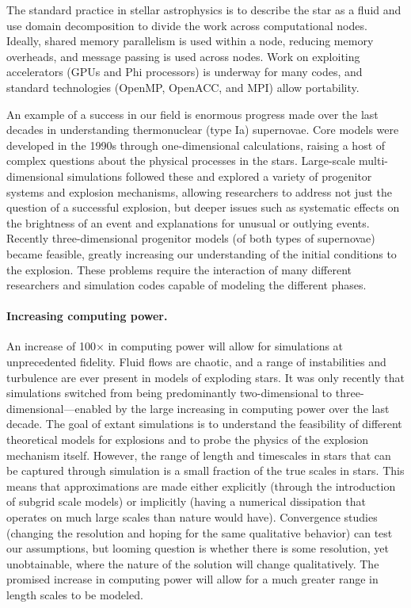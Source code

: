 \documentclass[11pt,twocolumn]{article}
\begin{document}
The standard practice in stellar astrophysics is to describe the star
as a fluid and use domain decomposition to divide the work across
computational nodes.  Ideally, shared memory parallelism is used
within a node, reducing memory overheads, and message passing is used 
across nodes.  Work on exploiting accelerators (GPUs and Phi processors) 
is underway for many codes, and standard technologies (OpenMP, 
OpenACC, and MPI) allow portability.

An example of a success in our field is enormous progress made over
the last decades in understanding thermonuclear (type Ia) supernovae.
Core models were developed in the 1990s through one-dimensional
calculations, raising a host of complex questions about the physical
processes in the stars.  Large-scale multi-dimensional simulations 
followed these and explored a variety of progenitor systems and explosion
mechanisms, allowing researchers to address not just the question of a
successful explosion, but deeper issues such as systematic effects on
the brightness of an event and explanations for unusual or outlying
events.  Recently three-dimensional progenitor models (of both types
of supernovae) became feasible, greatly increasing our understanding
of the initial conditions to the explosion.  These problems require
the interaction of many different researchers and simulation codes
capable of modeling the different phases.  

\paragraph*{Increasing computing power.}

An increase of 100$\times$ in computing power will allow for 
simulations at unprecedented fidelity. Fluid flows are chaotic, and a
range of instabilities and turbulence are ever present in models
of exploding stars. It was only recently that simulations switched
from being predominantly two-dimensional to
three-dimensional---enabled by the large increasing in computing power
over the last decade.  The goal of extant simulations is to understand
the feasibility of different theoretical models for explosions and to
probe the physics of the explosion mechanism itself.  However, the
range of length and timescales in stars that can be captured through
simulation is a small fraction of the true scales in stars.  This
means that approximations are made either explicitly (through the
introduction of subgrid scale models) or implicitly (having a
numerical dissipation that operates on much large scales than nature
would have).  Convergence studies (changing the resolution and hoping
for the same qualitative behavior) can test our assumptions, but
looming question is whether there is some resolution, yet
unobtainable, where the nature of the solution will change
qualitatively.  The promised increase in computing power will allow
for a much greater range in length scales to be modeled.
\end{document}
